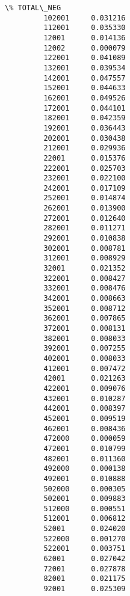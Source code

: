 \documentclass[11pt]{article}
\begin{document}
\begin{Verbatim}[commandchars=\\\{\}]
                 \% TOTAL\_NEG  
         102001     0.031216  
         112001     0.035330  
         12001      0.014136  
         12002      0.000079  
         122001     0.041089  
         132001     0.039534  
         142001     0.047557  
         152001     0.044633  
         162001     0.049526  
         172001     0.044101  
         182001     0.042359  
         192001     0.036443  
         202001     0.030438  
         212001     0.029936  
         22001      0.015376  
         222001     0.025703  
         232001     0.022100  
         242001     0.017109  
         252001     0.014874  
         262001     0.013900  
         272001     0.012640  
         282001     0.011271  
         292001     0.010838  
         302001     0.008781  
         312001     0.008929  
         32001      0.021352  
         322001     0.008427  
         332001     0.008476  
         342001     0.008663  
         352001     0.008712  
         362001     0.007865  
         372001     0.008131  
         382001     0.008033  
         392001     0.007255  
         402001     0.008033  
         412001     0.007472  
         42001      0.021263  
         422001     0.009076  
         432001     0.010287  
         442001     0.008397  
         452001     0.009519  
         462001     0.008436  
         472000     0.000059  
         472001     0.010799  
         482001     0.011360  
         492000     0.000138  
         492001     0.010888  
         502000     0.000305  
         502001     0.009883  
         512000     0.000551  
         512001     0.006812  
         52001      0.024020  
         522000     0.001270  
         522001     0.003751  
         62001      0.027042  
         72001      0.027878  
         82001      0.021175  
         92001      0.025309  
\end{Verbatim}
            

    
    
    
    
\end{document}
